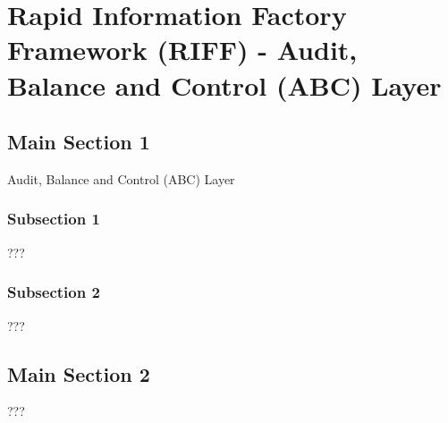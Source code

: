
\chapter{Rapid Information Factory Framework (RIFF) - Audit, Balance and Control (ABC) Layer} %

\label{Chapter27} %



\section{Main Section 1}

Audit, Balance and Control (ABC) Layer

\subsection{Subsection 1}

???


\subsection{Subsection 2}

???


\section{Main Section 2}

???
